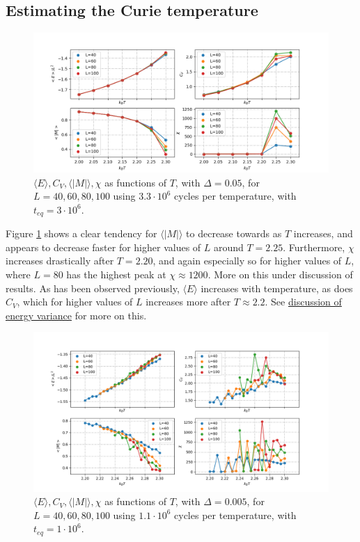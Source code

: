 \documentclass[%
oneside,                 %
final,                   %
10pt]{article}
\begin{document}
\subsection{Estimating the Curie temperature}
\label{SS.estCurie}
\begin{figure}[!htb]
        \centering 
         \includegraphics[scale=.5]{../Results/initial_phase.png} 
        \caption{$\langle E \rangle, C_V, \langle | M | \rangle, \chi$ as functions of $T$, with $\Delta=0.05$, for $L=40,60,80,100$ using $3.3\cdot 10^6$ cycles per temperature, with $t_{eq}=3 \cdot 10^6$.}
        \label{fig:initial_phase}   
\end{figure}

Figure \ref{fig:initial_phase} shows a clear tendency for $\langle |M| \rangle$ to decrease towards as $T$ increases, and appears to decrease faster for higher values of $L$ around $T=2.25$. Furthermore, $\chi$ increases drastically after $T=2.20$, and again especially so for higher values of $L$, where $L=80$ has the highest peak at $\chi \approx 1200$. More on this under discussion of results. As has been observed previously, $\langle E \rangle$ increases with temperature, as does $C_V$, which for higher values of $L$ increases more after $T\approx 2.2$. See \hyperref[SS.disc.var]{discussion of energy variance} for more on this. \newline


\begin{figure}[!htb]
        \centering 
         \includegraphics[scale=.5]{../Results/second_phase.png} 
        \caption{$\langle E \rangle, C_V, \langle | M | \rangle, \chi$ as functions of $T$, with $\Delta=0.005$, for $L=40,60,80,100$ using $1.1\cdot 10^6$ cycles per temperature, with $t_{eq}=1 \cdot 10^6$.}
        \label{fig:second_phase}   
\end{figure}
\end{document}
